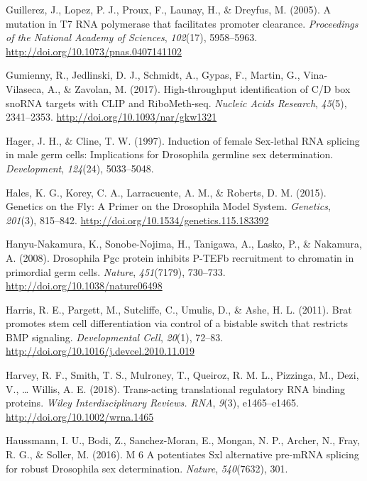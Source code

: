 \documentclass[12pt,twoside]{reedthesis}
\newlength{\cslhangindent}
\newenvironment{cslreferences}%
  {\setlength{\parindent}{0pt}%
  \everypar{\setlength{\hangindent}{\cslhangindent}}\ignorespaces}%
  {\par}
\begin{document}
\begin{cslreferences}
\leavevmode\hypertarget{ref-guillerezMutationT7RNA2005}{}%
Guillerez, J., Lopez, P. J., Proux, F., Launay, H., \& Dreyfus, M. (2005). A mutation in T7 RNA polymerase that facilitates promoter clearance. \emph{Proceedings of the National Academy of Sciences}, \emph{102}(17), 5958--5963. \url{http://doi.org/10.1073/pnas.0407141102}

\leavevmode\hypertarget{ref-Gumienny2017c}{}%
Gumienny, R., Jedlinski, D. J., Schmidt, A., Gypas, F., Martin, G., Vina-Vilaseca, A., \& Zavolan, M. (2017). High-throughput identification of C/D box snoRNA targets with CLIP and RiboMeth-seq. \emph{Nucleic Acids Research}, \emph{45}(5), 2341--2353. \url{http://doi.org/10.1093/nar/gkw1321}

\leavevmode\hypertarget{ref-Hager1997}{}%
Hager, J. H., \& Cline, T. W. (1997). Induction of female Sex-lethal RNA splicing in male germ cells: Implications for Drosophila germline sex determination. \emph{Development}, \emph{124}(24), 5033--5048.

\leavevmode\hypertarget{ref-Hales2015a}{}%
Hales, K. G., Korey, C. A., Larracuente, A. M., \& Roberts, D. M. (2015). Genetics on the Fly: A Primer on the Drosophila Model System. \emph{Genetics}, \emph{201}(3), 815--842. \url{http://doi.org/10.1534/genetics.115.183392}

\leavevmode\hypertarget{ref-Hanyu-Nakamura2008g}{}%
Hanyu-Nakamura, K., Sonobe-Nojima, H., Tanigawa, A., Lasko, P., \& Nakamura, A. (2008). Drosophila Pgc protein inhibits P-TEFb recruitment to chromatin in primordial germ cells. \emph{Nature}, \emph{451}(7179), 730--733. \url{http://doi.org/10.1038/nature06498}

\leavevmode\hypertarget{ref-Harris2011i}{}%
Harris, R. E., Pargett, M., Sutcliffe, C., Umulis, D., \& Ashe, H. L. (2011). Brat promotes stem cell differentiation via control of a bistable switch that restricts BMP signaling. \emph{Developmental Cell}, \emph{20}(1), 72--83. \url{http://doi.org/10.1016/j.devcel.2010.11.019}

\leavevmode\hypertarget{ref-Harvey2018f}{}%
Harvey, R. F., Smith, T. S., Mulroney, T., Queiroz, R. M. L., Pizzinga, M., Dezi, V., \ldots{} Willis, A. E. (2018). Trans-acting translational regulatory RNA binding proteins. \emph{Wiley Interdisciplinary Reviews. RNA}, \emph{9}(3), e1465--e1465. \url{http://doi.org/10.1002/wrna.1465}

\leavevmode\hypertarget{ref-Haussmann2016}{}%
Haussmann, I. U., Bodi, Z., Sanchez-Moran, E., Mongan, N. P., Archer, N., Fray, R. G., \& Soller, M. (2016). M 6 A potentiates Sxl alternative pre-mRNA splicing for robust Drosophila sex determination. \emph{Nature}, \emph{540}(7632), 301.


\end{cslreferences}
\end{document}
